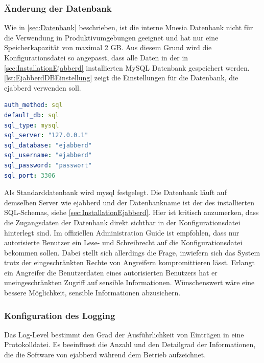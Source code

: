 \documentclass[a4paper,titlepage,halfparskip,12pt]{scrreprt}
\begin{document}
\begin{onehalfspacing}
\subsubsection*{Änderung der Datenbank}

Wie in \autoref{sec:Datenbank} beschrieben, ist die interne Mnesia Datenbank nicht für die Verwendung in Produktivumgebungen geeignet und hat nur eine Speicherkapazität von maximal 2 GB. Aus diesem Grund wird die Konfigurationsdatei so angepasst, dass alle Daten in der in \autoref{sec:InstallationEjabberd} installierten MySQL Datenbank gespeichert werden. \autoref{lst:EjabberdDBEinstellung} zeigt die Einstellungen für die Datenbank, die ejabberd verwenden soll.

\bigskip

\begin{lstlisting}[language=yaml, caption={Anpassung der Einstellungen für die Datenbank},label={lst:EjabberdDBEinstellung}]
auth_method: sql
default_db: sql
sql_type: mysql
sql_server: "127.0.0.1"
sql_database: "ejabberd"
sql_username: "ejabberd"
sql_password: "passwort"
sql_port: 3306
\end{lstlisting}

Als Standarddatenbank wird mysql festgelegt. Die Datenbank läuft auf demselben Server wie ejabberd und der Datenbankname ist der des installierten SQL-Schemas, siehe \autoref{sec:InstallationEjabberd}. Hier ist kritisch anzumerken, dass die Zugangsdaten der Datenbank direkt sichtbar in der Konfigurationsdatei hinterlegt sind. Im offiziellen Administration Guide \cite{plainTextConfigSecurity} ist empfohlen, dass nur autorisierte Benutzer ein Lese- und Schreibrecht auf die Konfigurationsdatei bekommen sollen. Dabei stellt sich allerdings die Frage, inwiefern sich das System trotz der eingeschränkten Rechte von Angreifern kompromittieren lässt. Erlangt ein Angreifer die Benutzerdaten eines autorisierten Benutzers hat er uneingeschränkten Zugriff auf sensible Informationen. Wünschenswert wäre eine bessere Möglichkeit, sensible Informationen abzusichern.

\subsubsection*{Konfiguration des Logging}

Das Log-Level bestimmt den Grad der Ausführlichkeit von Einträgen in eine Protokolldatei. Es beeinflusst die Anzahl und den Detailgrad der Informationen, die die Software von ejabberd während dem Betrieb aufzeichnet.\cite{ejabberdDoc}


\end{onehalfspacing}
\end{document}
